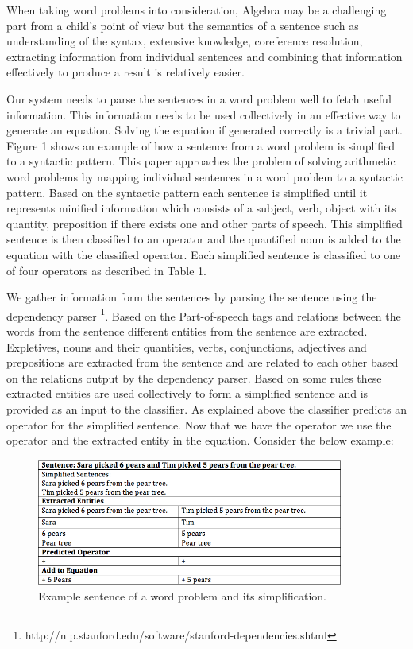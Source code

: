 \documentclass[11pt]{article}
\begin{document}
When taking word problems into consideration, Algebra may be a challenging part from a child's point of view but the semantics of a sentence such as understanding of the syntax, extensive knowledge, coreference resolution, extracting information from individual sentences and combining that information effectively to produce a result is relatively easier. \newline

Our system needs to parse the sentences in a word problem well to fetch useful information. This information needs to be used collectively in an effective way to generate an equation. Solving the equation if generated correctly is a trivial part. Figure 1 shows an example of how a sentence from a word problem is simplified to a syntactic pattern. This paper approaches the problem of solving arithmetic word problems by mapping individual sentences in a word problem to a syntactic pattern. Based on the syntactic pattern each sentence is simplified until it represents minified information which consists of a subject, verb, object with its quantity, preposition if there exists one and other parts of speech. This simplified sentence is then classified to an operator and the quantified noun is added to the equation with the classified operator. Each simplified sentence is classified to one of four operators as described in Table 1.\newline 

We gather information form the sentences by parsing the sentence using the dependency parser \footnote{http://nlp.stanford.edu/software/stanford-dependencies.shtml}. Based on the Part-of-speech tags and relations between the words from the sentence different entities from the sentence are extracted. Expletives, nouns and their quantities, verbs,  conjunctions, adjectives and prepositions are extracted from the sentence and are related to each other based on the relations output by the dependency parser. Based on some rules these extracted entities are used collectively to form a simplified sentence and is provided as an input to the classifier. As explained above the classifier predicts an operator for the simplified sentence. Now that we have the operator we use the operator and the extracted entity in the equation. Consider the below example:
\begin{figure}[h]
\includegraphics[width=0.90\textwidth]{Figure2}
\centering
\caption{\label{fig:Figure2}Example sentence of a word problem and its simplification.}
\end{figure}
\end{document}

